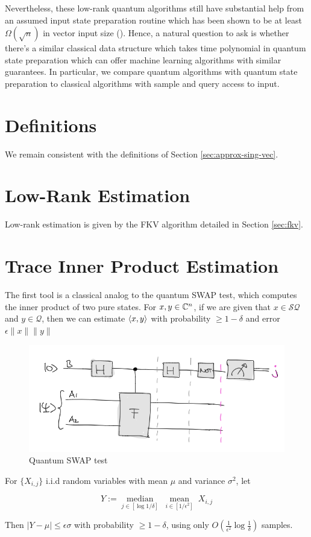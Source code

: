 \documentclass[main.tex]{subfiles}
\begin{document}
Nevertheless, these low-rank quantum algorithms still have substantial help from an assumed input state preparation routine which has been shown to be at least $\Omega(\sqrt{n})$ in vector input size (\cite{tang2018quantum}). Hence, a natural question to ask is whether there's a similar classical data structure which takes time polynomial in quantum state preparation which can offer machine learning algorithms with similar guarantees. In particular, we compare quantum algorithms with quantum state preparation to classical algorithms with sample and query access to input.	

\section{Definitions}

We remain consistent with the definitions of Section \ref{sec:approx-sing-vec}.

\section{Low-Rank Estimation}

Low-rank estimation is given by the FKV algorithm detailed in Section \ref{sec:fkv}.

\section{Trace Inner Product Estimation}

The first tool is a classical analog to the quantum SWAP test, which computes the inner product of two pure states. For $x, y \in \mathbb{C}^n$, if we are given that $x \in \mathcal{SQ}$ and $y \in \mathcal{Q}$, then we can estimate $\langle x, y\rangle$ with probability $\geq 1 - \delta$ and error $\epsilon \|x\|\|y\|$ 

\begin{figure}
\includegraphics[width= 0.5\linewidth]{images/swap_test.png}	
\caption{Quantum SWAP test}
\end{figure}

\begin{fact} For $\{X_{i,j}\}$ i.i.d random variables with mean $\mu$ and variance $\sigma^2$, let 

$$Y := \underset{j \in [\log 1/\delta]}{\operatorname{median}}\;\underset{i \in [1/\epsilon^2]}{\operatorname{mean}}\;X_{i,j}$$

Then $\vert Y - \mu\vert \leq \epsilon\sigma$ with probability $\geq 1-\delta$, using only $O(\frac{1}{\epsilon^2}\log\frac{1}{\delta})$ samples.
\end{fact}
\end{document}
